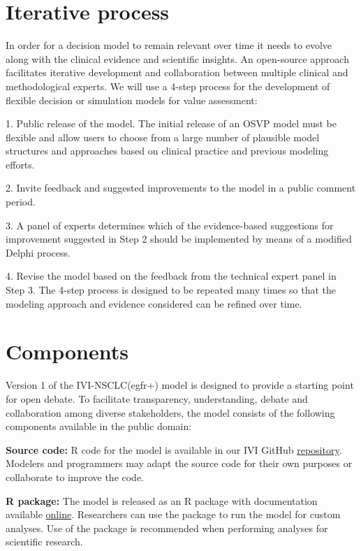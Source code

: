 \documentclass[11pt,final,fleqn]{article}\usepackage[]{graphicx}\usepackage[]{color}
\theoremstyle{plain}
\newcommand\R{{\textsf{R}}}
\begin{document}
{\section{Iterative process}\label{sec:process}
In order for a decision model to remain relevant over time it needs to evolve along with the clinical evidence and scientific insights. An open-source approach facilitates iterative development and collaboration between multiple clinical and methodological experts. We will use a 4-step process for the development of flexible decision or simulation models for value assessment:

1.	Public release of the model. The initial release of an OSVP model must be flexible and allow users to choose from a large number of plausible model structures and approaches based on clinical practice and previous modeling efforts.

2.	Invite feedback and suggested improvements to the model in a public comment period.

3.	A panel of experts determines which of the evidence-based suggestions for improvement suggested in Step 2 should be implemented by means of a modified Delphi process.

4.	Revise the model based on the feedback from the technical expert panel in Step 3.
The 4-step process is designed to be repeated many times so that the modeling approach and evidence considered can be refined over time. 


\section{Components}\label{sec:components}
Version 1 of the IVI-NSCLC(egfr+) model is designed to provide a starting point for open debate. To facilitate transparency, understanding, debate and collaboration among diverse stakeholders, the model consists of the following components available in the public domain:

\textbf{Source code:} \R{} code for the model is available in our IVI GitHub \href{https://github.com/InnovationValueInitiative/IVI-NSCLC}{repository}. Modelers and programmers may adapt the source code for their own purposes or collaborate to improve the code.

\textbf{\R{} package:} The model is released as an \R{} package with documentation available \href{https://innovationvalueinitiative.github.io/IVI-NSCLC/}{online}. Researchers can use the package to run the model for custom analyses. Use of the package is recommended when performing analyses for scientific research.

}
\end{document}
